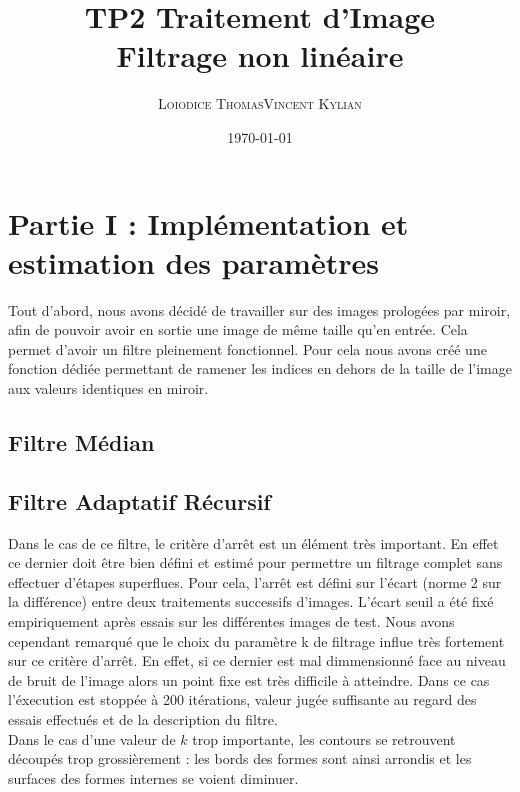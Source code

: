 \documentclass[a4,12pt]{article}
\title{\textbf{TP2 Traitement d'Image\\Filtrage non linéaire}}
\author{
\begin{tabular}{cc}
	\textsc{Loiodice Thomas} & \textsc{Vincent Kylian} \\
\end{tabular}}
\date{\small \today}
\begin{document}
\maketitle



\section{Partie I : Implémentation et estimation des paramètres}

Tout d'abord, nous avons décidé de travailler sur des images prologées par miroir, afin de pouvoir avoir en sortie une image de même taille qu'en entrée. Cela permet d'avoir un filtre pleinement fonctionnel. Pour cela nous avons créé une fonction dédiée permettant de ramener les indices en dehors de la taille de l'image aux valeurs identiques en miroir.

\subsection{Filtre Médian}

\subsection{Filtre Adaptatif Récursif}
Dans le cas de ce filtre, le critère d'arrêt est un élément très important. En effet ce dernier doit être bien défini et estimé pour permettre un filtrage complet sans effectuer d'étapes superflues. Pour cela, l'arrêt est défini sur l'écart (norme 2 sur la différence) entre deux traitements successifs d'images. L'écart seuil a été fixé empiriquement après essais sur les différentes images de test. Nous avons cependant remarqué que le choix du paramètre k de filtrage influe très fortement sur ce critère d'arrêt. En effet, si ce dernier est mal dimmensionné face au niveau de bruit de l'image alors un point fixe est très difficile à atteindre. Dans ce cas l'éxecution est stoppée à 200 itérations, valeur jugée suffisante au regard des essais effectués et de la description du filtre.\\

Dans le cas d'une valeur de $k$ trop importante, les contours se retrouvent découpés trop grossièrement : les bords des formes sont ainsi arrondis et les surfaces des formes internes se voient diminuer.\\
\end{document}
